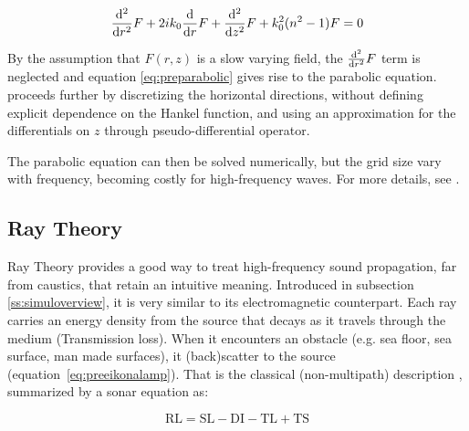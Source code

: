 \begin{equation}
\label{eq:preparabolic}
\frac{\mathrm{d^{2}}}{\mathrm{d}{r}^{2}}F + 2ik_0\frac{\mathrm{d}}{\mathrm{d}r}F + \frac{\mathrm{d^{2}}}{\mathrm{d}{z}^{2}}F + k_0^2(n^2-1)F = 0
\end{equation}

By the assumption that $F(r,z)$ is a slow varying field, the $\frac{\mathrm{d^{2}}}{\mathrm{d}{r}^{2}}F$
term is neglected and equation \ref{eq:preparabolic} gives rise to the parabolic
equation. \citet{LURTON} proceeds further by discretizing the horizontal
directions, without defining explicit dependence on the Hankel function, and
using an approximation for the differentials on $z$ through pseudo-differential
operator.

The parabolic equation can then be solved numerically, but the grid size vary
with frequency, becoming costly for high-frequency waves. For more
details, see \citet{jensen2011computational}.

\subsection{Ray Theory}
\label{ss:raytheory}

Ray Theory provides a good way to treat high-frequency sound propagation,
far from caustics, that retain an intuitive meaning. Introduced in subsection
\ref{ss:simuloverview}, it is very similar to its electromagnetic counterpart.
Each ray carries an energy density from the source that decays as it travels
through the medium (Transmission loss). When it encounters an obstacle (e.g. sea floor, sea
surface, man made surfaces), it (back)scatter to the source
(equation~\ref{eq:preeikonalamp}). That is the
classical (non-multipath) description
\cite{LURTON,Etter2013,miller2015real,bell1997application}, summarized by a
sonar equation as:

\begin{equation}
\label{eq:sonareq}
\text{RL} = \text{SL} - \text{DI} - \text{TL} + \text{TS}
\end{equation}

